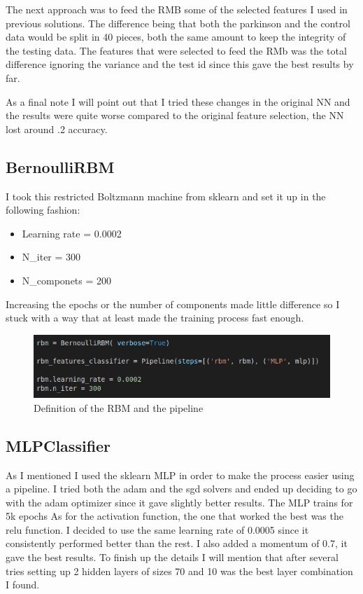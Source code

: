 \documentclass{article} %
\begin{document}
The next approach was to feed the RMB some of the selected features I used in  previous solutions. The difference being that both the parkinson and the control data would be split in 40 pieces, both the same amount to keep the integrity of the testing data. The features that were selected to feed the RMb was the total difference ignoring the variance and the test id since this gave the best results by far. 

As a final note I will point out that I tried these changes in the original NN and the results were quite worse compared to the original feature selection, the NN lost around .2 accuracy.
\bigskip

\subsection{BernoulliRBM}

I took this restricted Boltzmann machine from sklearn and set it up  in the following fashion:


\begin{itemize}
\item Learning rate = 0.0002
\item N\_iter = 300
\item N\_componets = 200 

\end{itemize}

Increasing the epochs or the number of components made little difference so I stuck with a way that at least made the training process fast enough.

\begin{figure}[h!]
  \includegraphics[scale = 1]{pipe.png}
  \centering
  \caption{Definition of the RBM and the pipeline}\hspace*{\fill}
  \label{fig:a}
\end{figure}

\bigskip
\bigskip
\bigskip
\bigskip
\bigskip
\subsection{MLPClassifier}

As I mentioned I used the sklearn MLP in order to make the process easier using a pipeline. I tried both the adam and the sgd solvers and ended up deciding to go with the adam optimizer since it gave slightly better results. The MLP trains for 5k epochs As for the activation function, the one that worked the best was the relu function. I decided to use the same learning rate of 0.0005 since it consistently performed better than the rest. I also added a  momentum of 0.7, it gave the best results. To finish up the details I will mention that after several tries setting up 2 hidden layers of sizes 70 and 10 was the best layer combination I found.
\end{document}
